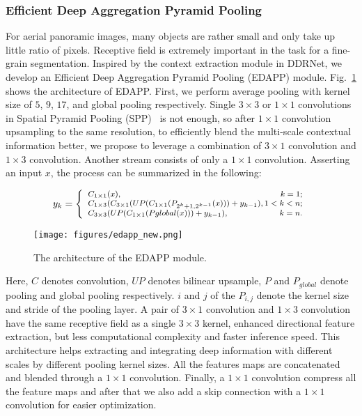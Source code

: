 \documentclass[letterpaper, 10 pt, conference]{ieeeconf}
\begin{document}
\subsubsection{Efficient Deep Aggregation Pyramid Pooling}
For aerial panoramic images, many objects are rather small and only take up little ratio of pixels. Receptive field is extremely important in the task for a fine-grain segmentation.
Inspired by the context extraction module in DDRNet\cite{ddrnet}, we develop an Efficient Deep Aggregation Pyramid Pooling (EDAPP) module.
Fig.~\ref{fig:edapp} shows the architecture of EDAPP.
First, we perform average pooling with kernel size of $5$, $9$, $17$, and global pooling respectively.
Single $3\times3$ or $1\times1$ convolutions in Spatial Pyramid Pooling (SPP)~\cite{SPP} is not enough, so after $1\times1$ convolution upsampling to the same resolution, to efficiently blend the multi-scale contextual information better, we propose to leverage a combination of $3\times1$ convolution and $1\times3$ convolution. Another stream consists of only a $1\times1$ convolution. Asserting an input $x$, the process can be summarized in the following:

\begin{align}
\footnotesize
    y_{k} =\left\{ \begin{array}{l}
    C_{1\times1}(x), \hfill k=1;  \\
    C_{1\times3}(C_{3\times1}(UP(C_{1\times1}(P_{2^{k}+1,2^{k-1}}(x)))+y_{k-1}), \hfill 1<k<n;  \\
    C_{3\times3}(UP(C_{1\times1}(P{global}(x)))+y_{k-1}), \hfill k=n. \\
 \end{array} \right.
\label{edapp_equotion}
\end{align}

\begin{figure}[!t]
    \centerline{\texttt{[image: figures/edapp\_new.png]}}
    \caption{The architecture of the EDAPP module.}
    \label{fig:edapp}
\end{figure}

Here, $C$ denotes convolution, $UP$ denotes bilinear upsample, $P$ and $P_{global}$ denote pooling and global pooling respectively.
$i$ and $j$ of the $P_{i,j}$ denote the kernel size and stride of the pooling layer. 
A pair of $3\times1$ convolution and $1\times3$ convolution have the same receptive field as a single $3\times3$ kernel, enhanced directional feature extraction, but less computational complexity and faster inference speed.
This architecture helps extracting and integrating deep information with different scales by different pooling kernel sizes. All the features maps are concatenated and blended through a $1\times1$ convolution. Finally, a $1\times1$ convolution compress all the feature maps and after that we also add a skip connection with a $1\times1$ convolution for easier optimization.
\end{document}
